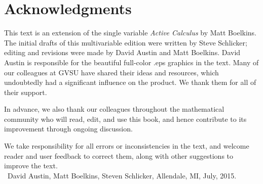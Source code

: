 \section*{Acknowledgments}

This text is an extension of the single variable \emph{Active Calculus} by Matt Boelkins. The initial drafts of this multivariable edition were written by Steve Schlicker; editing and revisions were made by David Austin and Matt Boelkins. David Austin is responsible for the beautiful full-color .eps graphics in the text.  Many of our colleagues at GVSU have shared their ideas and resources, which undoubtedly had a significant influence on the product. We thank them for all of their support. 

In advance, we also thank our colleagues throughout the mathematical community who will read, edit, and use this book, and hence contribute to its improvement through ongoing discussion.  

We take responsibility for all errors or inconsistencies in the text, and welcome reader and user feedback to correct them, along with other suggestions to improve the text. \\

\ \hfill David Austin, Matt Boelkins, Steven Schlicker, Allendale, MI,  July, 2015.
 
